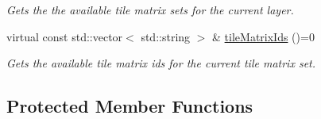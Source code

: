 \begin{DoxyCompactItemize}
\begin{DoxyCompactList}\small\item\em Gets the the available tile matrix sets for the current layer. \end{DoxyCompactList}\item 
virtual const std\+::vector$<$ std\+::string $>$ \& \hyperlink{group___imagery_module_ga2e5ad607fa13ac17e0fcb6b00af7d30e}{tile\+Matrix\+Ids} ()=0
\begin{DoxyCompactList}\small\item\em Gets the available tile matrix ids for the current tile matrix set. \end{DoxyCompactList}\end{DoxyCompactItemize}
\subsection*{Protected Member Functions}
